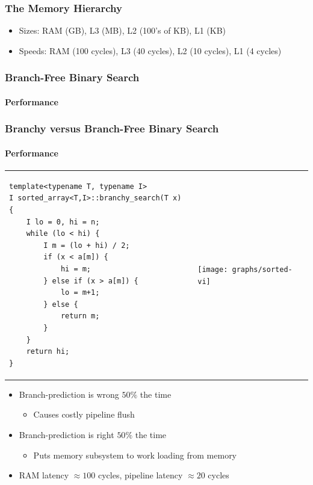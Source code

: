 \documentclass[xcolor=dvipsnames]{beamer}
\begin{document}
\begin{frame}
   \frametitle{The Memory Hierarchy}

   \begin{center}
   \end{center}
   \begin{itemize}
     \item<+->Sizes: RAM (GB), L3 (MB), L2 (100's of KB), L1 (KB)
     \item<+->Speeds: RAM (100 cycles), L3 (40 cycles), L2 (10 cycles), L1 (4 cycles)
   \end{itemize}
   
\end{frame}

\begin{frame}
   \frametitle{Branch-Free Binary Search}
   \framesubtitle{Performance}

   \begin{center}
   \end{center}
\end{frame}

\begin{frame}[fragile]
   \frametitle{Branchy versus Branch-Free Binary Search}
   \framesubtitle{Performance}

   \begin{tabular}{m{}m{}}
\tiny
 \begin{verbatim}
template<typename T, typename I>
I sorted_array<T,I>::branchy_search(T x) {
    I lo = 0, hi = n;
    while (lo < hi) {
        I m = (lo + hi) / 2;
        if (x < a[m]) {
            hi = m;
        } else if (x > a[m]) {
            lo = m+1;
        } else {
            return m;
        }
    }
    return hi;
}
\end{verbatim}
&
     \texttt{[image: graphs/sorted-vi]}
\end{tabular}
\begin{itemize}
  \item Branch-prediction is wrong $50\%$ the time
     \begin{itemize}
       \item Causes costly pipeline flush
     \end{itemize}
  \item Branch-prediction is right $50\%$ the time
      \begin{itemize}
       \item Puts memory subsystem to work loading from memory
     \end{itemize}
  \item RAM latency $\approx100$ cycles, pipeline latency $\approx 20$ cycles
\end{itemize}
\end{frame}
\end{document}
